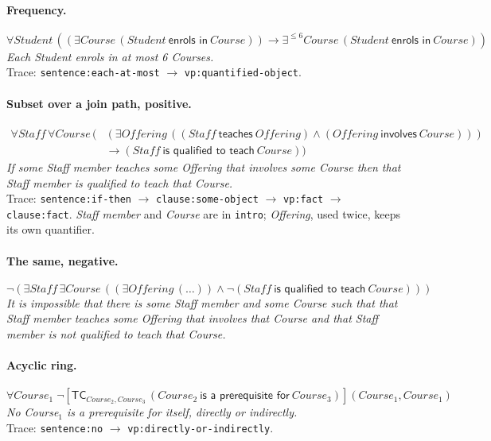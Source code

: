 \documentclass[11pt, a4paper]{article}
\newcommand{\code}[1]{\texttt{\color{codefg}#1}}
\begin{document}
\paragraph{Frequency.}
\[
\forall \mathit{Student}\,((\exists \mathit{Course}\,(\mathit{Student}\ \textsf{enrols in}\ \mathit{Course})) \to \exists^{\le 6}\mathit{Course}\,(\mathit{Student}\ \textsf{enrols in}\ \mathit{Course}))
\]
\textit{Each Student enrols in at most 6 Courses.}\\
Trace: \code{sentence:each-at-most} $\to$ \code{vp:quantified-object}.

\paragraph{Subset over a join path, positive.}
\[
\begin{aligned}\forall \mathit{Staff}\,\forall \mathit{Course}\,(&(\exists \mathit{Offering}\,((\mathit{Staff}\ \textsf{teaches}\ \mathit{Offering}) \wedge (\mathit{Offering}\ \textsf{involves}\ \mathit{Course})))\\ &\to (\mathit{Staff}\ \textsf{is qualified to teach}\ \mathit{Course}))\end{aligned}
\]
\textit{If some Staff member teaches some Offering that involves some Course
then that Staff member is qualified to teach that Course.}\\
Trace: \code{sentence:if-then} $\to$ \code{clause:some-object} $\to$
\code{vp:fact} $\to$ \code{clause:fact}. \textit{Staff member} and
\textit{Course} are in \code{intro}; \textit{Offering}, used twice, keeps its
own quantifier.

\paragraph{The same, negative.}
\[
\neg(\exists \mathit{Staff}\,\exists \mathit{Course}\,((\exists \mathit{Offering}\,(\ldots)) \wedge \neg(\mathit{Staff}\ \textsf{is qualified to teach}\ \mathit{Course})))
\]
\textit{It is impossible that there is some Staff member and some Course
such that that Staff member teaches some Offering that involves that Course
and that Staff member is not qualified to teach that Course.}

\paragraph{Acyclic ring.}
\[
\forall \mathit{Course}_1\;\neg[\mathsf{TC}_{\mathit{Course}_2,\mathit{Course}_3}\,(\mathit{Course}_2\ \textsf{is a prerequisite for}\ \mathit{Course}_3)](\mathit{Course}_1,\mathit{Course}_1)
\]
\textit{No Course$_1$ is a prerequisite for itself, directly or indirectly.}\\
Trace: \code{sentence:no} $\to$ \code{vp:directly-or-indirectly}.
\end{document}
